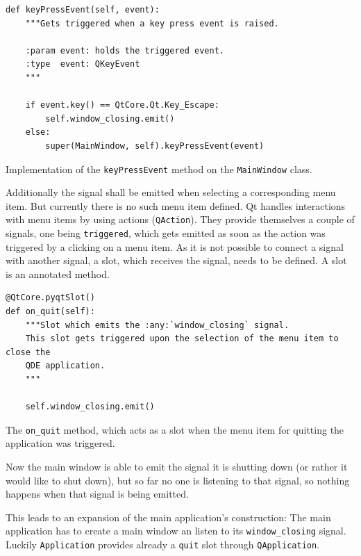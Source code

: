 \documentclass[10pt, openright, notitlepage]{scrreprt}
\begin{document}
\begin{listing}[H]
\begin{verbatim}
def keyPressEvent(self, event):
    """Gets triggered when a key press event is raised.

    :param event: holds the triggered event.
    :type  event: QKeyEvent
    """

    if event.key() == QtCore.Qt.Key_Escape:
        self.window_closing.emit()
    else:
        super(MainWindow, self).keyPressEvent(event)
\end{verbatim}
\caption{\label{main-window-keypressevent}
Implementation of the \texttt{keyPressEvent} method on the \texttt{MainWindow} class.}
\end{listing}

Additionally the signal shall be emitted when selecting a corresponding menu
item. But currently there is no such menu item defined. Qt handles interactions
with menu items by using actions (\texttt{QAction}). They provide themselves a couple
of signals, one being \texttt{triggered}, which gets emitted as soon as the action was
triggered by a clicking on a menu item. As it is not possible to connect a
signal with another signal, a slot, which receives the signal, needs to be
defined. A slot is an annotated method.

\begin{listing}[H]
\begin{verbatim}
@QtCore.pyqtSlot()
def on_quit(self):
    """Slot which emits the :any:`window_closing` signal.
    This slot gets triggered upon the selection of the menu item to close the
    QDE application.
    """

    self.window_closing.emit()
\end{verbatim}
\caption{\label{main-window-slots}
The \texttt{on\_quit} method, which acts as a slot when the menu item for quitting the application was triggered.}
\end{listing}

Now the main window is able to emit the signal it is shutting down (or
rather it would like to shut down), but so far no one is listening to that
signal, so nothing happens when that signal is being emitted.

This leads to an expansion of the main application's construction: The main
application has to create a main window an listen to its \texttt{window\_closing}
signal. Luckily \texttt{Application} provides already a \texttt{quit} slot through
\texttt{QApplication}.
\end{document}
